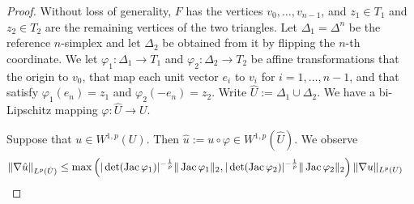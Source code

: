 \documentclass[10pt,letterpaper]{article}
\begin{document}
\begin{proof}
    Without loss of generality, $F$ has the vertices $v_0, \dots, v_{n-1}$,
    and $z_{1} \in T_{1}$ and $z_{2} \in T_{2}$ are the remaining vertices of the two triangles. 
    Let $\Delta_{1} = \Delta^{n}$ be the reference $n$-simplex and let $\Delta_{2}$ be obtained from it by flipping the $n$-th coordinate.
    We let $\varphi_{1} : \Delta_{1} \rightarrow T_{1}$ and $\varphi_{2} : \Delta_{2} \rightarrow T_{2}$
    be affine transformations that the origin to $v_0$, that map each unit vector $e_{i}$ to $v_{i}$ for $i = 1, \dots, n-1$,
    and that satisfy $\varphi_{1}(e_{n}) = z_{1}$ and $\varphi_{2}(-e_{n}) = z_{2}$.
    Write $\hat U := \Delta_1 \cup \Delta_2$.
    We have a bi-Lipschitz mapping $\varphi : \hat U \rightarrow U$. 
    
    Suppose that $u \in W^{1,p}(U)$. Then $\hat u := u \circ \varphi \in W^{1,p}(\hat U)$. 
    We observe 
    \begin{align*}
        \| \nabla \hat u \|_{L^{p}(\hat U)}
        &\leq 
        \max\left( 
            |\det(\Jacobian \varphi_1)|^{-\frac 1 p} \matnorm{ \Jacobian \varphi_1 }
            ,
            |\det(\Jacobian \varphi_2)|^{-\frac 1 p} \matnorm{ \Jacobian \varphi_2 }
        \right)
        \| \nabla u \|_{L^{p}(U)}

\end{align*}
\end{proof}
\end{document}

